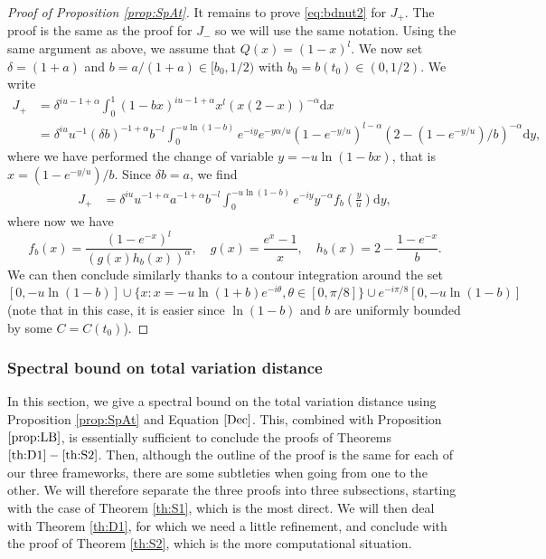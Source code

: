 \documentclass[]{scrartcl}
\renewcommand{\d}{\mathrm{d}}
\numberwithin{equation}{section}
\numberwithin{figure}{section}
\begin{document}
\begin{proof}[Proof of Proposition \ref{prop:SpAt}]
It remains to prove \eqref{eq:bdnut2} for $J_+$. The proof is the same as the proof for $J_-$ so we will use the same notation. Using the same argument as above, we assume that $Q(x) = (1-x)^l$. We now set  $\delta = (1+a)$ and $b = a / (1 + a) \in [b_0,1/2)$ with $b _0 = b(t_0) \in (0,1/2)$. We write 
\begin{align*}
	J_+ &=  \delta^{iu - 1 + \alpha} \int_{0}^{1} ( 1 - b x )^{iu - 1 + \alpha} x^l ( x(2- x))^{ -\alpha } \d x  \\
	& = \delta^{iu} u^{-1} (\delta b)^{-1 + \alpha } b ^{-l} \int_{0}^{- u \ln (1 - b)} e^{-iy } e^{-y \alpha / u }  (1-e^{-y/u})^{l - \alpha}  (2-(1 - e^{-y/u})/b )^{- \alpha } \d y,
\end{align*}
where we have performed the change of variable $y =  - u \ln ( 1 - bx)$, that is $x = (1 - e^{-y/u})/b$. Since $\delta b = a$, we find
\begin{align*}
	J_+ 
	& = \delta^{iu} u^{-1+\alpha} a^{-1 + \alpha } b ^{-l} \int_{0}^{- u \ln (1 - b)} e^{-iy} y^{-\alpha} f_b\left(\frac y u \right) \d y,
\end{align*}
where now we have
$$
f_b(x) =  \frac{(1-e^{-x})^{l} }{ \left( g(x)  h_b(x) \right)^{\alpha} }, \quad g(x) =  \frac{e^{x} -1 }{x} , \quad h_b(x) =  2 - \frac{1- e^{-x}}{b}.
$$		
We can then conclude similarly thanks to a contour integration around the set $[0, - u \ln (1 - b)] \cup \{ x : x =  -u \ln (1+b) e^{ - i \theta} , \theta \in [0,\pi/8]\} \cup e^{ - i \pi/8} [0, - u \ln (1-b)]$ (note that in this case, it is easier since $\ln (1-b) $ and $b$ are uniformly bounded by some $C = C(t_0)$). 
\end{proof}


\subsubsection{Spectral bound on total variation distance}
In this section, we give a spectral bound on the total variation distance using Proposition \ref{prop:SpAt} and Equation $\eqref{Dec}$. This, combined with Proposition $\ref{prop:LB}$, is essentially sufficient to conclude the proofs of Theorems $\ref{th:D1}-\ref{th:S2}$. Then, although the outline of the proof is the same for each of our three frameworks, there are some subtleties when going from one to the other. We will therefore separate the three proofs into three subsections, starting with the case of Theorem \ref{th:S1}, which is the most direct. We will then deal with Theorem \ref{th:D1}, for which we need a little refinement, and conclude with the proof of Theorem \ref{th:S2}, which is the more computational situation.
\end{document}
